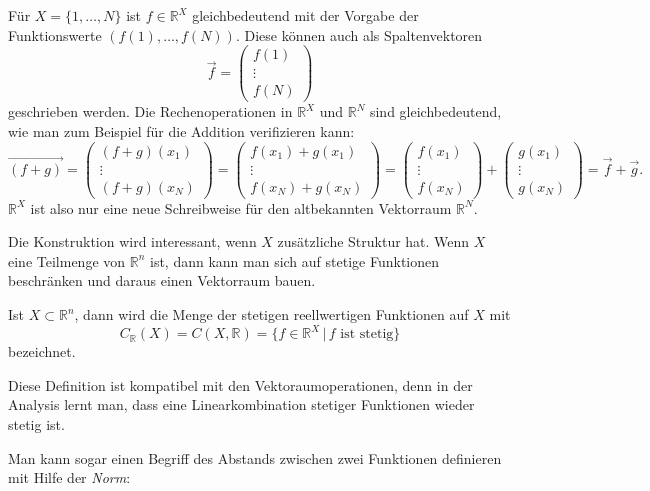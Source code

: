 \begin{beispiel}
Für $X=\{1,\dots,N\}$ ist $f\in \mathbb R^X$ gleichbedeutend mit
der Vorgabe der Funktionswerte $(f(1),\dots,f(N))$.
Diese können auch als Spaltenvektoren
\[
\vec{f} = \begin{pmatrix}f(1)\\\vdots\\f(N)\end{pmatrix}
\]
geschrieben werden.
Die Rechenoperationen in $\mathbb R^X$ und $\mathbb R^N$ sind gleichbedeutend,
wie man zum Beispiel für die Addition verifizieren kann:
\[
\overrightarrow{(f+g)}
=
\begin{pmatrix}
(f+g)(x_1)\\\vdots\\(f+g)(x_N)
\end{pmatrix}
=
\begin{pmatrix}
f(x_1)+g(x_1)\\\vdots\\f(x_N)+g(x_N)
\end{pmatrix}
=
\begin{pmatrix}
f(x_1)\\\vdots\\f(x_N)
\end{pmatrix}
+
\begin{pmatrix}
g(x_1)\\\vdots\\g(x_N)
\end{pmatrix}
=
\vec{f} + \vec{g}.
\]
$\mathbb R^X$ ist also nur eine neue Schreibweise für den altbekannten
Vektorraum $\mathbb R^N$.
\end{beispiel}

Die Konstruktion wird interessant, wenn $X$ zusätzliche Struktur hat.
Wenn $X$ eine Teilmenge von $\mathbb R^n$ ist, dann kann man sich auf
stetige Funktionen beschränken und daraus einen Vektorraum bauen.

\begin{definition}
Ist $X\subset\mathbb R^n$, dann wird die Menge der stetigen reellwertigen
%
%
Funktionen auf $X$ mit
\[
C_{\mathbb R}(X)
=
C(X,\mathbb R)
=
\{ f\in \mathbb R^X\,|\,\text{$f$ ist stetig}\}
\]
bezeichnet.
\end{definition}

Diese Definition ist kompatibel mit den Vektoraumoperationen,
denn in der Analysis lernt man, dass eine Linearkombination
stetiger Funktionen wieder stetig ist.

Man kann sogar einen Begriff des Abstands zwischen zwei Funktionen
definieren mit Hilfe der {\em Norm}:

